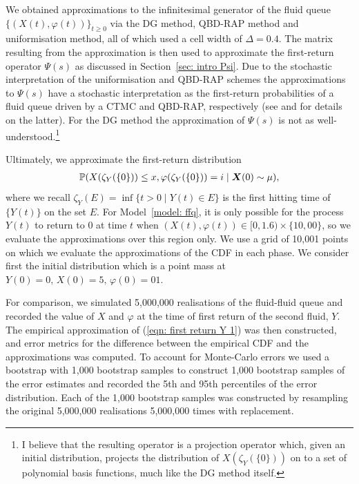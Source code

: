 We obtained approximations to the infinitesimal generator of the fluid queue \(\{(X(t),\varphi(t))\}_{t\geq 0}\) via the DG method, QBD-RAP method and uniformisation method, all of which used a cell width of \(\Delta=0.4\). The matrix resulting from the approximation is then used to approximate the first-return operator \(\mathbb\Psi(s)\) as discussed in Section~\ref{sec: intro Psi}. Due to the stochastic interpretation of the uniformisation and QBD-RAP schemes the approximations to \(\Psi(s)\) have a stochastic interpretation as the first-return probabilities of a fluid queue driven by a CTMC and QBD-RAP, respectively (see \cite[Chapter~7]{p2019} and \cite{bgnp2021} for details on the latter). For the DG method the approximation of \(\mathbb \Psi(s)\) is not as well-understood.\footnote{I believe that the resulting operator is a projection operator which, given an initial distribution, projects the distribution of \(X(\zeta_{Y}(\{0\}))\) on to a set of polynomial basis functions, much like the DG method itself.}

Ultimately, we approximate the first-return distribution 
\begin{align}\label{eqn: first return Y 1}
	\mathbb P(X(\zeta_{Y}(\{0\}))\leq x, \varphi(\zeta_{Y}(\{0\}))=i\mid \boldsymbol X(0)\sim \mu),
\end{align}
where we recall \(\zeta_{Y}(E) = \inf\{t>0\mid Y(t)\in E\}\) is the first hitting time of \(\{Y(t)\}\) on the set \(E\). For Model~\ref{model: ffq}, it is only possible for the process \(Y(t)\) to return to \(0\) at time \(t\) when \((X(t),\varphi(t))\in[0,1.6)\times \{10,00\}\), so we evaluate the approximations over this region only. We use a grid of 10,001 points on which we evaluate the approximations of the CDF in each phase. We consider first the initial distribution which is a point mass at \(Y(0)=0,\, X(0)=5,\, \varphi(0)=01\). 

For comparison, we simulated 5,000,000 realisations of the fluid-fluid queue and recorded the value of \(X\) and \(\varphi\) at the time of first return of the second fluid, \(Y\). The empirical approximation of (\ref{eqn: first return Y 1}) was then constructed, and error metrics for the difference between the empirical CDF and the approximations was computed. To account for Monte-Carlo errors we used a bootstrap with 1,000 bootstrap samples to construct 1,000 bootstrap samples of the error estimates and recorded the 5th and 95th percentiles of the error distribution. Each of the 1,000 bootstrap samples was constructed by resampling the original 5,000,000 realisations 5,000,000 times with replacement.


